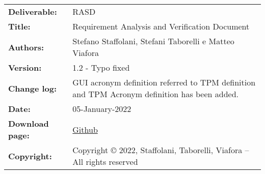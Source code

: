 \begin{table}[h!]
\begin{tabu} to \textwidth { X[0.3,r,p] X[0.7,l,p] }
\hline

\textbf{Deliverable:} & RASD\\
\textbf{Title:} & Requirement Analysis and Verification Document \\
\textbf{Authors:} & Stefano Staffolani, Stefani Taborelli e Matteo Viafora \\
\textbf{Version:} & 1.2 - Typo fixed \\
\textbf{Change log:} & GUI acronym definition referred to TPM definition and TPM Acronym definition has been added.\\
\textbf{Date:} & 05-January-2022 \\
\textbf{Download page:} & \href{https://github.com/ViaforaMatteo/StaffolaniTaborelliViafora}{Github} \\
\textbf{Copyright:} & Copyright © 2022, Staffolani, Taborelli, Viafora – All rights reserved \\
\hline
\end{tabu}
\end{table}